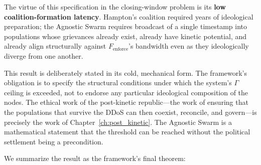 The virtue of this specification in the closing-window problem is its \textbf{low coalition-formation latency}. Hampton's coalition required years of ideological preparation; the Agnostic Swarm requires broadcast of a single timestamp into populations whose grievances already exist, already have kinetic potential, and already align structurally against $F_{\text{enforce}}$'s bandwidth even as they ideologically diverge from one another.

This result is deliberately stated in its cold, mechanical form. The framework's obligation is to specify the structural conditions under which the system's $\Gamma$ ceiling is exceeded, not to endorse any particular ideological composition of the nodes. The ethical work of the post-kinetic republic---the work of ensuring that the populations that survive the DDoS can then coexist, reconcile, and govern---is precisely the work of Chapter~\ref{ch:post_kinetic}. The Agnostic Swarm is a mathematical statement that the threshold can be reached without the political settlement being a precondition.

We summarize the result as the framework's final theorem:

